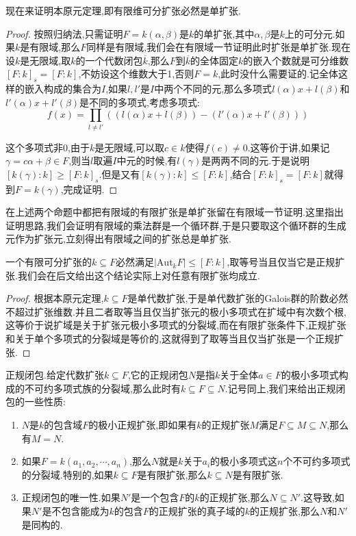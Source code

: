 现在来证明本原元定理,即有限维可分扩张必然是单扩张.
\begin{proof}

按照归纳法,只需证明$F=k(\alpha,\beta)$是$k$的单扩张,其中$\alpha,\beta$是$k$上的可分元.如果$k$是有限域,那么$F$同样是有限域,我们会在有限域一节证明此时扩张是单扩张.现在设$k$是无限域,取$k$的一个代数闭包$\overline{k}$,那么$F$到$\overline{k}$的全体固定$k$的嵌入个数就是可分维数$[F:k]_s=[F:k]$,不妨设这个维数大于1,否则$F=k$,此时没什么需要证的.记全体这样的嵌入构成的集合为$I$,如果$l,l'$是$I$中两个不同的元,那么多项式$l(\alpha)x+l(\beta)$和$l'(\alpha)x+l'(\beta)$是不同的多项式,考虑多项式:
$$f(x)=\prod_{l\not=l'}\left((l(\alpha)x+l(\beta))-(l'(\alpha)x+l'(\beta))\right)$$

这个多项式非0,由于$k$是无限域,可以取$c\in k$使得$f(c)\not=0$.这等价于讲,如果记$\gamma=c\alpha+\beta\in F$,则当$l$取遍$I$中元的时候,有$l(\gamma)$是两两不同的元.于是说明$[k(\gamma):k]\ge[F:k]_s$.但是又有$[k(\gamma):k]\le[F:k]$,结合$[F:k]_s=[F:k]$就得到$F=k(\gamma)$,完成证明.
\end{proof}

在上述两个命题中都把有限域的有限扩张是单扩张留在有限域一节证明.这里指出证明思路,我们会证明有限域的乘法群是一个循环群,于是只要取这个循环群的生成元作为扩张元,立刻得出有限域之间的扩张总是单扩张.

一个有限可分扩张的$k\subseteq F$必然满足$|\mathrm{Aut}_kF|\le[F:k]$,取等号当且仅当它是正规扩张.我们会在后文给出这个结论实际上对任意有限扩张均成立.
\begin{proof}

根据本原元定理,$k\subseteq F$是单代数扩张,于是单代数扩张的Galois群的阶数必然不超过扩张维数.并且二者取等当且仅当扩张元的极小多项式在扩域中有次数个根,这等价于说扩域是关于扩张元极小多项式的分裂域,而在有限扩张条件下,正规扩张和关于单个多项式的分裂域是等价的,这就得到了取等当且仅当扩张是一个正规扩张.
\end{proof}

正规闭包.给定代数扩张$k\subseteq F$,它的正规闭包$N$是指$k$关于全体$a\in F$的极小多项式构成的不可约多项式族的分裂域,那么此时有$k\subseteq F\subseteq N$.记号同上,我们来给出正规闭包的一些性质:
\begin{enumerate}
	\item $N$是$k$的包含域$F$的极小正规扩张,即如果有$k$的正规扩张$M$满足$F\subseteq M\subseteq N$,那么有$M=N$.
    \item 如果$F=k(a_1,a_2,\cdots,a_n)$,那么$N$就是$k$关于$a_i$的极小多项式这$n$个不可约多项式的分裂域.特别的,如果$k\subseteq F$是有限扩张,那么$k\subseteq N$是有限扩张.
    \item 正规闭包的唯一性.如果$N'$是一个包含$F$的$k$的正规扩张,那么$N\subseteq N'$.这导致,如果$N'$是不包含能成为$k$的包含$F$的正规扩张的真子域的$k$的正规扩张,那么$N$和$N'$是同构的.
\end{enumerate}
\newpage
